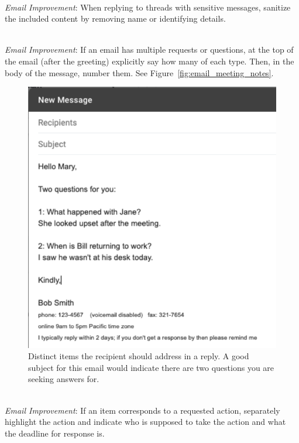 \ \\
\textit{Email Improvement}: When replying to threads with sensitive messages, sanitize the included content by removing name or identifying details.

\ \\
\textit{Email Improvement}: If an email has multiple requests or questions, at the top of the email (after the greeting) explicitly say how many of each type. Then, in the body of the message, number them. See Figure~\ref{fig:email_meeting_notes}.

\begin{figure}
\includegraphics[width=1\textwidth]{images/email_two_questions.pdf}
\caption{Distinct items the recipient should address in a reply. A good subject for this email would indicate there are two questions you are seeking answers for.}
\label{fig:email_two_questions}
\end{figure}

\ \\
\textit{Email Improvement}: If an item corresponds to a requested action, separately highlight the action and indicate who is supposed to take the action and what the deadline for response is.

